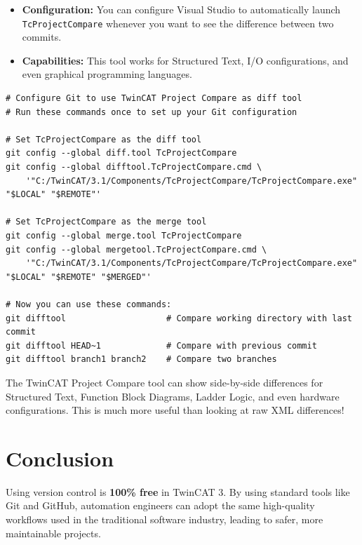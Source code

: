 \documentclass[11pt,a4paper]{article}
\begin{document}
\begin{itemize}[leftmargin=*]
    \item \textbf{Configuration:} You can configure Visual Studio to automatically launch \texttt{TcProjectCompare} whenever you want to see the difference between two commits.
    
    \item \textbf{Capabilities:} This tool works for Structured Text, I/O configurations, and even graphical programming languages.
\end{itemize}

\begin{lstlisting}[style=bashstyle]
# Configure Git to use TwinCAT Project Compare as diff tool
# Run these commands once to set up your Git configuration

# Set TcProjectCompare as the diff tool
git config --global diff.tool TcProjectCompare
git config --global difftool.TcProjectCompare.cmd \
    '"C:/TwinCAT/3.1/Components/TcProjectCompare/TcProjectCompare.exe" "$LOCAL" "$REMOTE"'

# Set TcProjectCompare as the merge tool
git config --global merge.tool TcProjectCompare
git config --global mergetool.TcProjectCompare.cmd \
    '"C:/TwinCAT/3.1/Components/TcProjectCompare/TcProjectCompare.exe" "$LOCAL" "$REMOTE" "$MERGED"'

# Now you can use these commands:
git difftool                    # Compare working directory with last commit
git difftool HEAD~1             # Compare with previous commit
git difftool branch1 branch2    # Compare two branches
\end{lstlisting}

\begin{tipbox}
The TwinCAT Project Compare tool can show side-by-side differences for Structured Text, Function Block Diagrams, Ladder Logic, and even hardware configurations. This is much more useful than looking at raw XML differences!
\end{tipbox}

\section{Conclusion}

Using version control is \textbf{100\% free} in TwinCAT 3. By using standard tools like Git and GitHub, automation engineers can adopt the same high-quality workflows used in the traditional software industry, leading to safer, more maintainable projects.
\end{document}
